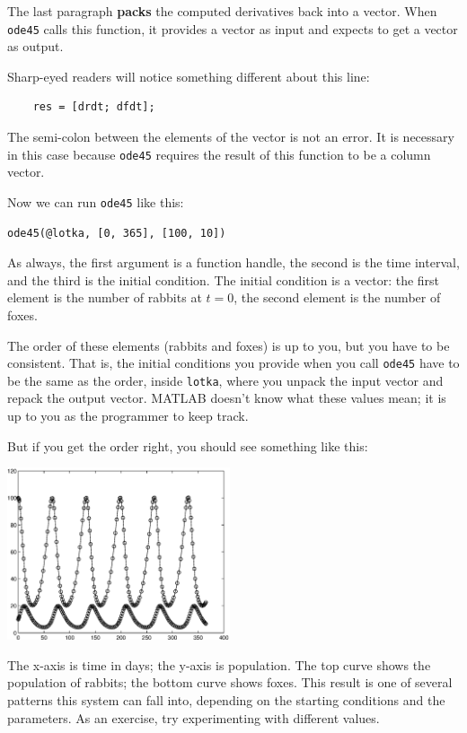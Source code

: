 \documentclass{book}
\begin{document}
The last paragraph {\bf packs} the computed derivatives back into a
vector.  When {\tt ode45} calls this function, it provides a vector
as input and expects to get a vector as output.

Sharp-eyed readers will notice something different about this line:

\begin{verbatim}
    res = [drdt; dfdt];
\end{verbatim}

The semi-colon between the elements of the vector is not an error.  It
is necessary in this case because {\tt ode45} requires the result of
this function to be a column vector.

Now we can run {\tt ode45} like this:

\begin{verbatim}
ode45(@lotka, [0, 365], [100, 10])
\end{verbatim}

As always, the first argument is a function handle, the second is the
time interval, and the third is the initial condition.  The initial
condition is a vector: the first element is the number of rabbits at
$t=0$, the second element is the number of foxes.

The order of these elements (rabbits and foxes) is up to you, but
you have to be consistent.  That is, the initial conditions you
provide when you call {\tt ode45} have to be the same as the order,
inside {\tt lotka}, where you unpack the input vector and repack
the output vector.  MATLAB doesn't know what these values mean;
it is up to you as the programmer to keep track.

But if you get the order right, you should see something like this:

\beforefig \centerline{\includegraphics[height=2in]{figs/lotka.eps}}

The x-axis is time in days; the y-axis is population.  The top
curve shows the population of rabbits; the bottom curve shows
foxes.  This result is one of several patterns
this system can fall into, depending on the starting conditions
and the parameters.  As an exercise, try experimenting with
different values.
\end{document}
